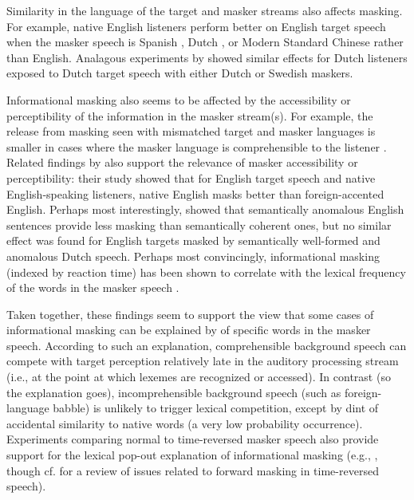 Similarity in the language of the target and masker streams also affects masking.  For example, native English listeners perform better on English target speech when the masker speech is Spanish \citep{GarciaLecumberriCooke2006}, Dutch \citep{BrouwerEtAl2012}, or Modern Standard Chinese \citep{VanEngenBradlow2007} rather than English.  Analagous experiments by \citet{RhebergenEtAl2005} showed similar effects for Dutch listeners exposed to Dutch target speech with either Dutch or Swedish maskers.  

Informational masking also seems to be affected by the accessibility or perceptibility of the information in the masker stream(s).  For example, the release from masking seen with mismatched target and masker languages is smaller in cases where the masker language is comprehensible to the listener \citep{VanEngen2010}.  Related findings by \citet{CalandruccioEtAl2010} also support the relevance of masker accessibility or perceptibility: their study showed that for English target speech and native English-speaking listeners, native English masks better than foreign-accented English.\footnotemark{}  Perhaps most interestingly, \citet{BrouwerEtAl2012} showed that semantically anomalous English sentences provide less masking than semantically coherent ones, but no similar effect was found for English targets masked by semantically well-formed and anomalous Dutch speech.  Perhaps most convincingly, informational masking (indexed by reaction time) has been shown to correlate with the lexical frequency of the words in the masker speech \citep{BoulengerEtAl2010}.

Taken together, these findings seem to support the view that some cases of informational masking can be explained by  of specific words in the masker speech.  According to such an explanation, comprehensible background speech can compete with target perception relatively late in the auditory processing stream (i.e., at the point at which lexemes are recognized or accessed).  In contrast (so the explanation goes), incomprehensible background speech (such as foreign-language babble) is unlikely to trigger lexical competition, except by dint of accidental similarity to native words (a very low probability occurrence).  Experiments comparing normal to time-reversed masker speech also provide support for the lexical pop-out explanation of informational masking (e.g., \citealt{HoenEtAl2007}, though cf. \citealt{RhebergenEtAl2005} for a review of issues related to forward masking in time-reversed speech).


